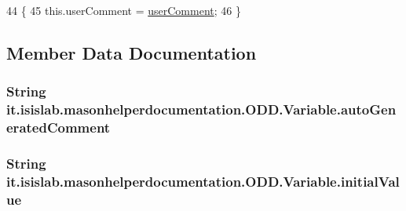 \begin{DoxyCode}
44                                                    \{
45         this.userComment = \hyperlink{classit_1_1isislab_1_1masonhelperdocumentation_1_1_o_d_d_1_1_variable_abc4f019f82f47614b2b62743799dc7b5}{userComment};
46     \}
\end{DoxyCode}


\subsection{Member Data Documentation}
\hypertarget{classit_1_1isislab_1_1masonhelperdocumentation_1_1_o_d_d_1_1_variable_a66bdb6cd067ee33adcd4556f5b672f23}{
\subsubsection[{auto\-Generated\-Comment}]{\setlength{\rightskip}{0pt plus 5cm}String it.\-isislab.\-masonhelperdocumentation.\-O\-D\-D.\-Variable.\-auto\-Generated\-Comment\hspace{0.3cm}{\ttfamily [package]}}}\label{classit_1_1isislab_1_1masonhelperdocumentation_1_1_o_d_d_1_1_variable_a66bdb6cd067ee33adcd4556f5b672f23}
\hypertarget{classit_1_1isislab_1_1masonhelperdocumentation_1_1_o_d_d_1_1_variable_abf11129fa15afb4375d1e040728de05d}{
\subsubsection[{initial\-Value}]{\setlength{\rightskip}{0pt plus 5cm}String it.\-isislab.\-masonhelperdocumentation.\-O\-D\-D.\-Variable.\-initial\-Value\hspace{0.3cm}{\ttfamily [package]}}}\label{classit_1_1isislab_1_1masonhelperdocumentation_1_1_o_d_d_1_1_variable_abf11129fa15afb4375d1e040728de05d}
